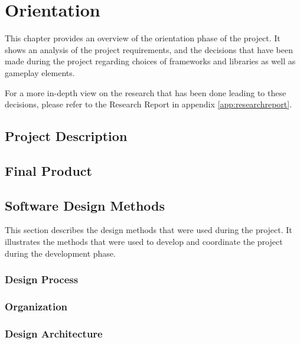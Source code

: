 \chapter{Orientation} \label{cha:orientation}

  This chapter provides an overview of the orientation phase of the project.
  It shows an analysis of the project requirements, and the decisions that
  have been made during the project regarding choices of frameworks and
  libraries as well as gameplay elements.

  For a more in-depth view on the research that has been done leading to
  these decisions, please refer to the Research Report in appendix
  \ref{app:researchreport}.

  \section{Project Description} \label{sec:projectdescription}

  \section{Final Product} \label{sec:finalproduct}

  \section{Software Design Methods} \label{sec:designmethods}
    This section describes the design methods that were used during the
    project. It illustrates the methods that were used to develop and
    coordinate the project during the development phase.

    \subsection{Design Process} \label{ssec:designprocess}

    \subsection{Organization} \label{sec:organization}

    \subsection{Design Architecture} \label{ssec:designarchitecture}
